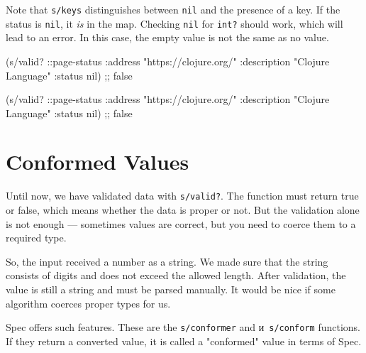 \fi


Note that \verb|s/keys| distinguishes between \verb|nil| and the presence of a key. If the status is \verb|nil|, it \emph{is} in the map. Checking \verb|nil| for \verb|int?| should work, which will lead to an error. In this case, the empty value is not the same as no value. 

\ifx\DEVICETYPE\MOBILE

\begin{english}
  \begin{clojure}
(s/valid? ::page-status
  {:address "https://clojure.org/"
   :description "Clojure Language"
   :status nil})
;; false
  \end{clojure}
\end{english}

\else

\begin{english}
  \begin{clojure}
(s/valid? ::page-status
          {:address "https://clojure.org/"
           :description "Clojure Language"
           :status nil})
;; false
  \end{clojure}
\end{english}

\fi

\section{Conformed Values}

\label{spec-conform}


Until now, we have validated data with \verb|s/valid?|. The function must return true or false, which means whether the data is proper or not. But the validation alone is not enough — sometimes values are correct, but you need to coerce them to a required type.

So, the input received a number as a string. We made sure that the string consists of digits and does not exceed the allowed length. After validation, the value is still a string and must be parsed manually. It would be nice if some algorithm coerces proper types for us.


\mnoindent
Spec offers such features. These are the \verb|s/conformer| and и~\verb|s/conform| functions. If they return a converted value, it is called a "conformed" value in terms of Spec.

